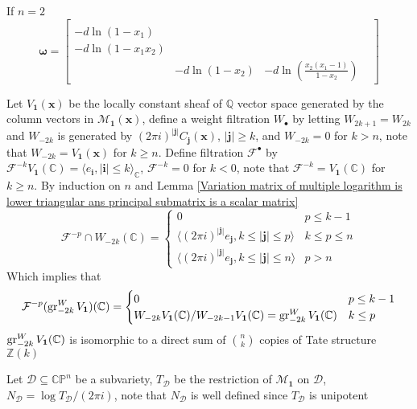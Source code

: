 \documentclass[main]{subfiles}
\begin{document}
\begin{example}
If $n=2$
\[\bm\omega=\begin{bmatrix}
&&& \\
-d\ln(1-x_1)&&& \\
-d\ln(1-x_1x_2)&&& \\
&-d\ln(1-x_2)&-d\ln\left(\frac{x_2(x_1-1)}{1-x_2}\right)&
\end{bmatrix}\]
\end{example}

\begin{definition}
Let $V_{\mathbf 1}(\mathbf x)$ be the locally constant sheaf of $\mathbb Q$ vector space generated by the column vectors in $\mathcal M_{\mathbf 1}(\mathbf x)$, define a weight filtration $W_\bullet$ by letting $W_{2k+1}=W_{2k}$ and $W_{-2k}$ is generated by $(2\pi i)^{|\mathbf j|}C_{\mathbf j}(\mathbf x)$, $|\mathbf j|\geq k$, and $W_{-2k}=0$ for $k>n$, note that $W_{-2k}=V_{\mathbf 1}(\mathbf x)$ for $k\geq n$. Define filtration $\mathcal F^\bullet$ by $\mathcal F^{-k}V_{\mathbf 1}(\mathbb C)=\langle e_{\mathbf i},|\mathbf i|\leq k\rangle_{\mathbb C}$, $\mathcal F^{-k}=0$ for $k<0$, note that $\mathcal F^{-k}=V_{\mathbf 1}(\mathbb C)$ for $k\geq n$. By induction on $n$ and Lemma \ref{Variation matrix of multiple logarithm is lower triangular ans principal submatrix is a scalar matrix}
\[\mathcal F^{-p}\cap W_{-2k}(\mathbb C)=\begin{cases}
0&p\leq k-1 \\
\langle(2\pi i)^{|\mathbf j|}e_{\mathbf j},k\leq|\mathbf j|\leq p\rangle&k\leq p\leq n \\
\langle(2\pi i)^{|\mathbf j|}e_{\mathbf j},k\leq|\mathbf j|\leq n\rangle&p>n
\end{cases}\]
Which implies that
\[\mathcal F^{-p}(\operatorname{gr}_{-2k}^WV_{\mathbf1})(\mathbb C)=\begin{cases}
0&p\leq k-1 \\
W_{-2k}V_{\mathbf1}(\mathbb C)/W_{-2k-1}V_{\mathbf1}(\mathbb C)=\operatorname{gr}_{-2k}^WV_{\mathbf1}(\mathbb C)&k\leq p
\end{cases}\]
$\operatorname{gr}_{-2k}^WV_{\mathbf1}(\mathbb C)$ is isomorphic to a direct sum of $\binom{n}{k}$ copies of Tate structure $\mathbb Z(k)$
\end{definition}

Let $\mathcal D\subseteq\mathbb{CP}^n$ be a subvariety, $T_{\mathcal D}$ be the restriction of $\mathcal M_{\mathbf1}$ on $\mathcal D$, $N_{\mathcal D}=\log T_{\mathcal D}/(2\pi i)$, note that $N_{\mathcal D}$ is well defined since $T_{\mathcal D}$ is unipotent
\end{document}
